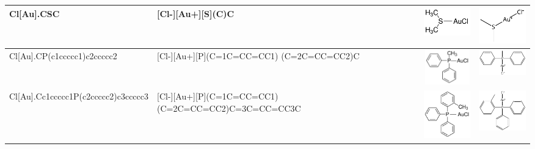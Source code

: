 \begin{landscape}
\begin{longtable}{m{7cm}m{8cm}m{2.3cm}m{2.3cm}}
 Cl[Au].CSC & 
 [Cl-][Au+][S](C)C & 
 \includegraphics[width=2.2cm]{imagenes/sigmaAldrich/Chloro(dimethylsulfide)gold(I).png} & 
 \includegraphics[width=2.2cm]{imagenes/sciFinder/pdf/Chloro(dimethylsulfide)gold(I).pdf} \\
\hline



 Cl[Au].CP(c1ccccc1)c2ccccc2 & 
 [Cl-][Au+][P](C=1C=CC=CC1) (C=2C=CC=CC2)C & 
 \includegraphics[width=2.1cm, height=1.5cm]{imagenes/sigmaAldrich/Chloro(methyldiphenylphosphine)gold(I).jpeg} & 
 \includegraphics[width=2.2cm]{imagenes/sciFinder/pdf/Chloro(methyldiphenylphosphine)gold(I).pdf} \\
\hline




 Cl[Au].Cc1ccccc1P(c2ccccc2)c3ccccc3 & 
 [Cl-][Au+][P](C=1C=CC=CC1) (C=2C=CC=CC2)C=3C=CC=CC3C & 
 \includegraphics[width=2.2cm]{imagenes/sigmaAldrich/Chloro[diphenyl(o-tolyl)phosphine]gold(I).jpeg} & 
 \includegraphics[width=2.2cm]{imagenes/sciFinder/pdf/Chloro[diphenyl(o-tolyl)phosphine]gold(I).pdf} \\
\hline



\end{longtable}
\end{landscape}

